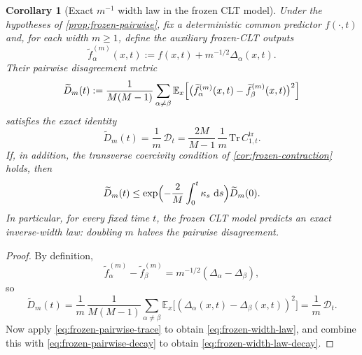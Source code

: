 \documentclass[11pt]{article}
\newtheorem{corollary}[theorem]{Corollary}
\theoremstyle{definition}
\newcommand{\E}{\mathbb{E}}
\newcommand{\dd}{\,\mathrm{d}}
\begin{document}
\begin{corollary}[Exact $m^{-1}$ width law in the frozen CLT model]
\label{cor:frozen-width-law}
Under the hypotheses of \cref{prop:frozen-pairwise}, fix a deterministic common predictor $f(\cdot,t)$ and,
for each width $m\ge 1$, define the auxiliary frozen-CLT outputs
\[
  \widetilde f_\alpha^{(m)}(x,t)
  :=
  f(x,t)+m^{-1/2}\Delta_\alpha(x,t).
\]
Their pairwise disagreement metric
\[
  \widetilde D_m(t)
  :=
  \frac{1}{M(M-1)}
  \sum_{\alpha\neq\beta}
  \E_x\Bigl[\bigl(\widetilde f_\alpha^{(m)}(x,t)-\widetilde f_\beta^{(m)}(x,t)\bigr)^2\Bigr]
\]
satisfies the exact identity
\begin{equation}
  \widetilde D_m(t)
  =
  \frac{1}{m}\,\mathcal D_t
  =
  \frac{2M}{M-1}\,
  \frac{1}{m}\,
  \mathrm{Tr}\,C_{1,t}^{\mathrm{tr}}.
  \label{eq:frozen-width-law}
\end{equation}
If, in addition, the transverse coercivity condition of \cref{cor:frozen-contraction} holds, then
\begin{equation}
  \widetilde D_m(t)
  \le
  \exp\Bigl(
    -\frac{2}{M}\int_0^t \kappa_s\,\dd s
  \Bigr)
  \widetilde D_m(0).
  \label{eq:frozen-width-law-decay}
\end{equation}
In particular, for every fixed time $t$, the frozen CLT model predicts an exact inverse-width law:
doubling $m$ halves the pairwise disagreement.
\end{corollary}

\begin{proof}
By definition,
\[
  \widetilde f_\alpha^{(m)}-\widetilde f_\beta^{(m)}
  =
  m^{-1/2}(\Delta_\alpha-\Delta_\beta),
\]
so
\[
  \widetilde D_m(t)
  =
  \frac{1}{m}\,
  \frac{1}{M(M-1)}
  \sum_{\alpha\neq\beta}
  \E_x\bigl[(\Delta_\alpha(x,t)-\Delta_\beta(x,t))^2\bigr]
  =
  \frac{1}{m}\,\mathcal D_t.
\]
Now apply \cref{eq:frozen-pairwise-trace} to obtain \eqref{eq:frozen-width-law}, and combine this with \cref{eq:frozen-pairwise-decay} to obtain \eqref{eq:frozen-width-law-decay}.
\end{proof}
\end{document}
